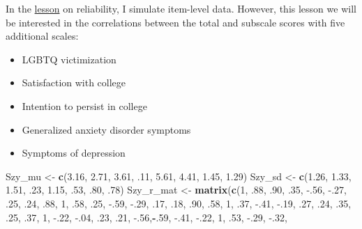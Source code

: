 \documentclass[
  english,
]{book}
\newenvironment{Shaded}{\begin{snugshade}}{\end{snugshade}}
\newcommand{\DecValTok}[1]{\textcolor[rgb]{0.00,0.00,0.81}{#1}}
\newcommand{\FloatTok}[1]{\textcolor[rgb]{0.00,0.00,0.81}{#1}}
\newcommand{\KeywordTok}[1]{\textcolor[rgb]{0.13,0.29,0.53}{\textbf{#1}}}
\newcommand{\NormalTok}[1]{#1}
\newcommand{\OperatorTok}[1]{\textcolor[rgb]{0.81,0.36,0.00}{\textbf{#1}}}
\newcommand{\StringTok}[1]{\textcolor[rgb]{0.31,0.60,0.02}{#1}}
\providecommand{\tightlist}{%
  \setlength{\itemsep}{0pt}\setlength{\parskip}{0pt}}
\begin{document}
In the \protect\hyperlink{rxx}{lesson} on reliability, I simulate item-level data. However, this lesson we will be interested in the correlations between the total and subscale scores with five additional scales:

\begin{itemize}
\tightlist
\item
  LGBTQ victimization
\item
  Satisfaction with college
\item
  Intention to persist in college
\item
  Generalized anxiety disorder symptoms
\item
  Symptoms of depression
\end{itemize}

\begin{Shaded}
\begin{Highlighting}[]
\NormalTok{Szy_mu <-}\StringTok{ }\KeywordTok{c}\NormalTok{(}\FloatTok{3.16}\NormalTok{, }\FloatTok{2.71}\NormalTok{, }\FloatTok{3.61}\NormalTok{, }\FloatTok{.11}\NormalTok{, }\FloatTok{5.61}\NormalTok{, }\FloatTok{4.41}\NormalTok{, }\FloatTok{1.45}\NormalTok{, }\FloatTok{1.29}\NormalTok{)}
\NormalTok{Szy_sd <-}\StringTok{ }\KeywordTok{c}\NormalTok{(}\FloatTok{1.26}\NormalTok{, }\FloatTok{1.33}\NormalTok{, }\FloatTok{1.51}\NormalTok{, }\FloatTok{.23}\NormalTok{, }\FloatTok{1.15}\NormalTok{, }\FloatTok{.53}\NormalTok{, }\FloatTok{.80}\NormalTok{, }\FloatTok{.78}\NormalTok{)}
\NormalTok{Szy_r_mat <-}\StringTok{ }\KeywordTok{matrix}\NormalTok{(}\KeywordTok{c}\NormalTok{(}\DecValTok{1}\NormalTok{,   }\FloatTok{.88}\NormalTok{, }\FloatTok{.90}\NormalTok{, }\FloatTok{.35}\NormalTok{, }\FloatTok{-.56}\NormalTok{, }\FloatTok{-.27}\NormalTok{, }\FloatTok{.25}\NormalTok{, }\FloatTok{.24}\NormalTok{,}
                  \FloatTok{.88}\NormalTok{,  }\DecValTok{1}\NormalTok{,  }\FloatTok{.58}\NormalTok{, }\FloatTok{.25}\NormalTok{, }\FloatTok{-.59}\NormalTok{, }\FloatTok{-.29}\NormalTok{, }\FloatTok{.17}\NormalTok{, }\FloatTok{.18}\NormalTok{,}
                  \FloatTok{.90}\NormalTok{, }\FloatTok{.58}\NormalTok{,  }\DecValTok{1}\NormalTok{,  }\FloatTok{.37}\NormalTok{, }\FloatTok{-.41}\NormalTok{, }\FloatTok{-.19}\NormalTok{, }\FloatTok{.27}\NormalTok{, }\FloatTok{.24}\NormalTok{,}
                  \FloatTok{.35}\NormalTok{, }\FloatTok{.25}\NormalTok{, }\FloatTok{.37}\NormalTok{,  }\DecValTok{1}\NormalTok{,  }\FloatTok{-.22}\NormalTok{, }\FloatTok{-.04}\NormalTok{, }\FloatTok{.23}\NormalTok{, }\FloatTok{.21}\NormalTok{,}
                 \FloatTok{-.56}\NormalTok{,}\OperatorTok{-}\NormalTok{.}\DecValTok{59}\NormalTok{, }\FloatTok{-.41}\NormalTok{, }\FloatTok{-.22}\NormalTok{, }\DecValTok{1}\NormalTok{,   }\FloatTok{.53}\NormalTok{, }\FloatTok{-.29}\NormalTok{, }\FloatTok{-.32}\NormalTok{,}

\end{Highlighting}
\end{Shaded}
\end{document}

